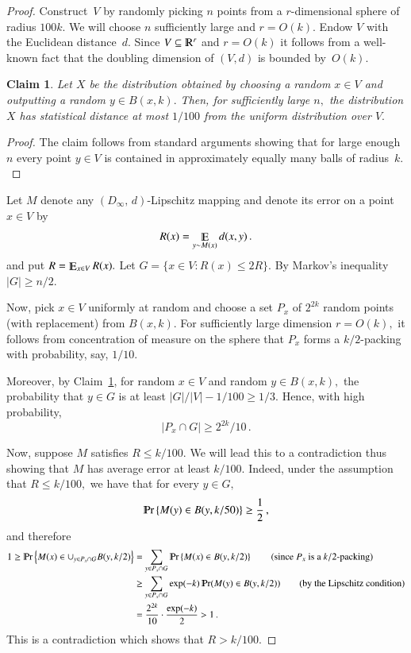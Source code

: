 \documentclass[letterpaper,11pt]{article}
\newtheorem{claim}[theorem]{Claim}%
\theoremstyle{definition}
\renewcommand{\mathbb}{\varmathbb}
\newcommand{\Esymb}{\mathbb{E}}
\newcommand{\Psymb}{\mathbb{P}}
\DeclareMathOperator*{\E}{\Esymb}
\DeclareMathOperator*{\ProbOp}{\Psymb r}
\renewcommand{\Pr}{\ProbOp}
\newcommand{\mper}{\,.}
\newcommand{\mcom}{\,,}
\newcommand\dtoDinfty{D_\infty,\, d}
\begin{document}
\begin{proof}
Construct~$V$ by randomly picking $n$ points from a $r$-dimensional sphere
of radius $100k.$ We will choose $n$ sufficiently large and $r=O(k).$
Endow $V$ with the Euclidean distance~$d.$ Since
$V\subseteq\mathbb{R}^r$ and $r=O(k)$
it follows from a well-known fact that the doubling dimension of $(V,d)$
is bounded by~$O(k).$

\begin{claim}\label{cla:random}
Let $X$ be the distribution obtained by choosing a random $x\in V$ and
outputting a random $y\in B(x,k).$ Then, for sufficiently large $n,$ the
distribution $X$ has statistical distance at most $1/100$ from the uniform
distribution over $V.$
\end{claim}
\begin{proof}
The claim follows from standard arguments showing that for large enough $n$
every point $y\in V$ is contained in approximately equally many balls of
radius~$k.$
\end{proof}

Let $M$ denote any $(\dtoDinfty)$-Lipschitz mapping and denote its
error on a point $x\in V$ by
\[
R(x) =\E_{y\sim M(x)}d(x,y)\mper
\]
and put $R= \E_{x\in V}R(x).$
%
Let $G=\{x\in V\colon R(x)\le 2R\}.$
By Markov's inequality $|G|\ge n/2.$


Now, pick $x\in V$ uniformly at random
and choose a set $P_x$ of $2^{2k}$ random points
(with replacement) from $B(x,k).$
For sufficiently large dimension $r=O(k),$ it follows from concentration of
measure on the sphere that $P_x$ forms a $k/2$-packing with probability,
say, $1/10.$

Moreover, by
Claim~\ref{cla:random}, for random $x\in V$ and random $y\in B(x,k),$ the
probability that $y\in G$ is at least $|G|/|V| - 1/100\ge 1/3.$ Hence, with
high probability,
\begin{equation}
|P_x\cap G|\ge 2^{2k}/10\mper
\end{equation}

Now, suppose $M$ satisfies $R\le k/100.$ We will lead this to a contradiction
thus showing that $M$ has average error at least $k/100.$ Indeed, under the
assumption that $R\le k/100,$ we have that for every $y\in G,$
\begin{equation}
\Pr\left\{ M(y)\in B(y,k/50)\right\}\ge\frac12\mcom
\end{equation}
and therefore
\begin{align*}
1\ge \Pr\left\{M(x)\in \cup_{y\in P_x\cap G}B(y,k/2)\right\}
& = \sum_{y\in P_x\cap G}\Pr\left\{M(x)\in B(y,k/2)\right\} \tag{since $P_x$ is
a $k/2$-packing}\\
& \ge \sum_{y\in P_x\cap G}\exp(-k)\Pr(M(y)\in B(y,k/2)) \tag{by the Lipschitz
condition}\\
& = \frac{2^{2k}}{10}\cdot \frac{\exp(-k)}2
 > 1\mper
\end{align*}
This is a contradiction which shows that $R>k/100.$
\end{proof}
\end{document}

